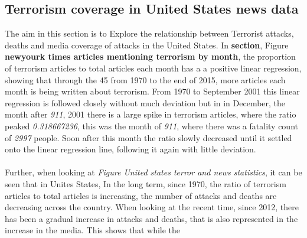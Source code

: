 \documentclass[10pt,a4paper]{article}
\begin{document}
\subsection{Terrorism coverage in United States news data}
The aim in this section is to Explore the relationship between Terrorist attacks, deaths and media coverage of attacks in the United States. In \textbf{section}, Figure \textbf{newyourk times articles mentioning terrorism by month}, the proportion of terrorism articles to total articles each month has a a positive linear regression, showing that through the 45 from 1970 to the end of 2015, more articles each month is being written about terrorism. From 1970 to September 2001 this linear regression is followed closely without much deviation but in in December, the month after \textit{911}, 2001 there is a large spike in terrorism articles, where the ratio peaked \textit{0.318667236}, this was the month of \textit{911}, where there was a fatality count of \textit{2997} people. Soon after this month the ratio slowly decreased until it settled onto the linear regression line, following it again with little deviation. 
\\\\
Further, when looking at \textit{Figure United states terror and news statistics}, it can be seen that in Unites States, In the long term, since 1970, the ratio of terrorism articles to total articles is increasing, the number of attacks and deaths are decreasing across the country. When looking at the recent time, since 2012, there has been a gradual increase in attacks and deaths, that is also represented in the increase in the media. This shows that while the 
\\\\
\end{document}
